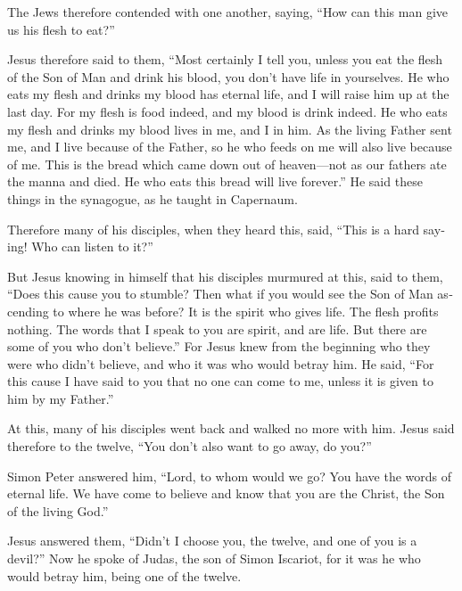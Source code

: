 \begin{paracol}{2}
\begin{otherlanguage}{english}
 The Jews therefore contended with one another, saying,
``How can this man give us his flesh to eat?''

 Jesus therefore said to them, ``Most certainly I tell
you, unless you eat the flesh of the Son of Man and drink his blood, you
don't have life in yourselves.  He who eats my flesh and
drinks my blood has eternal life, and I will raise him up at the last
day.  For my flesh is food indeed, and my blood is drink
indeed.  He who eats my flesh and drinks my blood lives
in me, and I in him.  As the living Father sent me, and I
live because of the Father, so he who feeds on me will also live because
of me.  This is the bread which came down out of
heaven---not as our fathers ate the manna and died. He who eats this
bread will live forever.''  He said these things in the
synagogue, as he taught in Capernaum.

 Therefore many of his disciples, when they heard this,
said, ``This is a hard saying! Who can listen to it?''

 But Jesus knowing in himself that his disciples murmured
at this, said to them, ``Does this cause you to stumble? 
Then what if you would see the Son of Man ascending to where he was
before?  It is the spirit who gives life. The flesh
profits nothing. The words that I speak to you are spirit, and are life.
 But there are some of you who don't believe.'' For Jesus
knew from the beginning who they were who didn't believe, and who it was
who would betray him.  He said, ``For this cause I have
said to you that no one can come to me, unless it is given to him by my
Father.''

 At this, many of his disciples went back and walked no
more with him.  Jesus said therefore to the twelve, ``You
don't also want to go away, do you?''

 Simon Peter answered him, ``Lord, to whom would we go?
You have the words of eternal life.  We have come to
believe and know that you are the Christ, the Son of the living God.''

 Jesus answered them, ``Didn't I choose you, the twelve,
and one of you is a devil?''  Now he spoke of Judas, the
son of Simon Iscariot, for it was he who would betray him, being one of
the twelve.


\end{otherlanguage}
\end{paracol}
